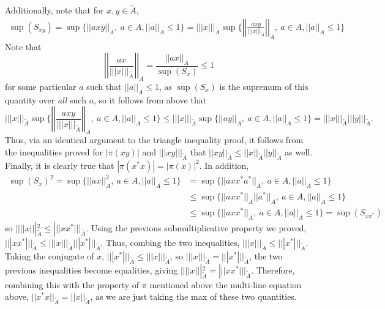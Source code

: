 \documentclass[aps,pra,showpacs,notitlepage,onecolumn,superscriptaddress,nofootinbib]{revtex4-1}
\theoremstyle{definition}
\begin{document}
Additionally, note that for $x, y \in \widetilde{A}$,
\begin{align}
  \sup(S_{xy}) = \sup \{||axy||_A, \ a \in A, ||a||_A \leq 1\} = |||x|||_{\widetilde{A}} \sup \{ \left|\left|\frac{ax y}{|||x|||_{\widetilde{A}}} \right|\right|_A, \ a \in A, ||a||_A \leq 1\}
\end{align}
Note that
\begin{equation}
  \left|\left| \frac{ax}{|||x|||_{\widetilde{A}}}\right|\right|_{A} = \frac{||ax||_{A}}{\sup(S_x)} \leq 1
\end{equation}
for some particular $a$ such that $||a||_A \leq 1$, as $\sup(S_x)$ is the supremum of this quantity over \emph{all} such $a$, so it follows from above that
\begin{equation}
  |||x|||_{\widetilde{A}} \sup \{ \left|\left|\frac{ax y}{|||x|||_{\widetilde{A}}} \right|\right|_A, \ a \in A, ||a||_A \leq 1\} \leq |||x|||_{\widetilde{A}} \sup \{ ||ay||_{A}, \ a \in A, ||a||_A \leq 1\} = |||x|||_{\widetilde{A}} |||y|||_{\widetilde{A}}.
  \end{equation}
Thus, via an identical argument to the triangle inequality proof, it follows from the inequalities proved for $|\pi(xy)|$ and $|||xy|||_{\widetilde{A}}$ that $||xy||_{\widetilde{A}} \leq ||x||_{\widetilde{A}} ||y||_{\widetilde{A}}$ as well.
Finally, it is clearly true that $|\pi(x^{*} x)| = |\pi(x)|^2$. In addition,
\begin{align}
  \sup(S_{x})^2 = \sup \{ ||a x||^2_{A}, \ a \in A, ||a||_{A} \leq 1\} &= \sup \{ ||a x x^{*} a^{*}||_{A}, \ a \in A, ||a||_{A} \leq 1\}
  \\ &\leq \sup \{ ||a x x^{*}||_A ||a^{*}||_{A}, \ a \in A, ||a||_{A} \leq 1\}
  \\ & \leq \sup \{ ||a x x^{*} ||_A, \ a \in A, ||a||_{A} \leq 1\} = \sup(S_{x x^{*}})
\end{align}
so $||||x|||_{\widetilde{A}}^2 \leq |||x x^{*}|||_{\widetilde{A}}$. Using the previous submultiplicative property we proved, $|||x x^{*}|||_{\widetilde{A}} \leq |||x|||_{\widetilde{A}} |||x^{*}|||_{\widetilde{A}}$. Thus, combing the two inequalities, $|||x|||_{\widetilde{A}} \leq |||x^{*}|||_{\widetilde{A}}$. Taking the conjugate of $x$, $|||x^{*}|||_{\widetilde{A}} \leq |||x|||_{\widetilde{A}}$, so $|||x|||_{\widetilde{A}} = |||x^{*}|||_{\widetilde{A}}$, the two previous inequalities become equalities, giving $||||x|||_{\widetilde{A}}^2 = |||x x^{*}|||_{\widetilde{A}}$. Therefore,
combining this with the property of $\pi$ mentioned above the multi-line equation above, $||x^{*} x||_{\widetilde{A}} = ||x||_{\widetilde{A}}$, as we are just taking the max of these two quantities.
\end{document}
